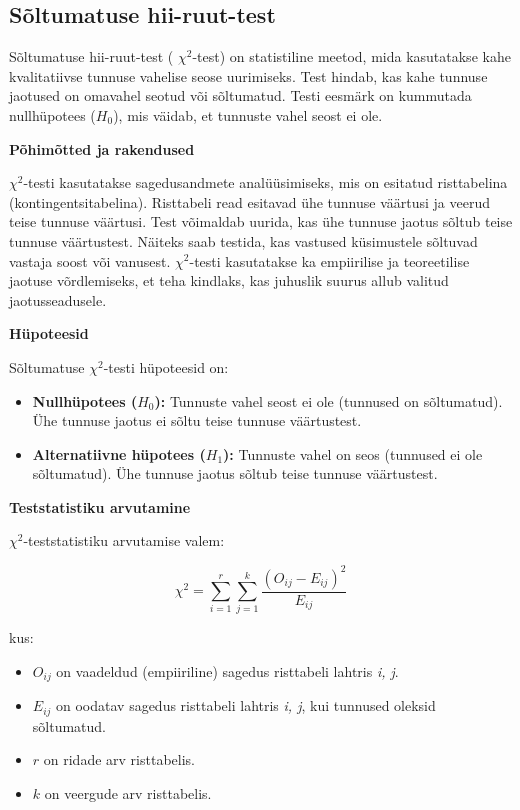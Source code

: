 \documentclass[
]{book}
\providecommand{\tightlist}{%
  \setlength{\itemsep}{0pt}\setlength{\parskip}{0pt}}
\begin{document}
\subsection{Sõltumatuse hii-ruut-test}\label{suxf5ltumatuse-hii-ruut-test}

Sõltumatuse hii-ruut-test ( \(\chi^2\)-test) on statistiline meetod, mida kasutatakse kahe kvalitatiivse tunnuse vahelise seose uurimiseks. Test hindab, kas kahe tunnuse jaotused on omavahel seotud või sõltumatud. Testi eesmärk on kummutada nullhüpotees (\(H_0\)), mis väidab, et tunnuste vahel seost ei ole.

\textbf{Põhimõtted ja rakendused}

\(\chi^2\)-testi kasutatakse sagedusandmete analüüsimiseks, mis on esitatud risttabelina (kontingentsitabelina). Risttabeli read esitavad ühe tunnuse väärtusi ja veerud teise tunnuse väärtusi. Test võimaldab uurida, kas ühe tunnuse jaotus sõltub teise tunnuse väärtustest. Näiteks saab testida, kas vastused küsimustele sõltuvad vastaja soost või vanusest. \(\chi^2\)-testi kasutatakse ka empiirilise ja teoreetilise jaotuse võrdlemiseks, et teha kindlaks, kas juhuslik suurus allub valitud jaotusseadusele.

\textbf{Hüpoteesid}

Sõltumatuse \(\chi^2\)-testi hüpoteesid on:

\begin{itemize}
\tightlist
\item
  \textbf{Nullhüpotees (\(H_0\)):} Tunnuste vahel seost ei ole (tunnused on sõltumatud). Ühe tunnuse jaotus ei sõltu teise tunnuse väärtustest.
\item
  \textbf{Alternatiivne hüpotees (\(H_1\)):} Tunnuste vahel on seos (tunnused ei ole sõltumatud). Ühe tunnuse jaotus sõltub teise tunnuse väärtustest.
\end{itemize}

\textbf{Teststatistiku arvutamine}

\(\chi^2\)-teststatistiku arvutamise valem:

\[
\chi^2 = \sum_{i=1}^{r} \sum_{j=1}^{k} \frac{(O_{ij} - E_{ij})^2}{E_{ij}}
\]

kus:

\begin{itemize}
\tightlist
\item
  \(O_{ij}\) on vaadeldud (empiiriline) sagedus risttabeli lahtris \emph{i, j}.
\item
  \(E_{ij}\) on oodatav sagedus risttabeli lahtris \emph{i, j}, kui tunnused oleksid sõltumatud.
\item
  \(r\) on ridade arv risttabelis.
\item
  \(k\) on veergude arv risttabelis.
\end{itemize}
\end{document}
